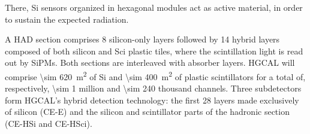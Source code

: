 \documentclass[11pt]{article}
\begin{document}
\cite{bruno_chep23}













There, \ac{Si} sensors organized in hexagonal modules act as active material, in order to sustain the expected radiation.
\cite{refCUDA1}

A \ac{HAD} section comprises \num{8} silicon-only layers followed by \num{14} hybrid layers composed of both silicon and \ac{Sci} plastic tiles, where the scintillation light is read out by \acp{SiPM}.
Both sections are interleaved with absorber layers.
\ac{HGCAL} will comprise \SI{\sim 620}{\meter\squared} of \ac{Si} and \SI{\sim 400}{\meter\squared} of plastic scintillators for a total of, respectively, \num{\sim 1} million and \num{\sim 240} thousand channels.
Three subdetectors form HGCAL’s hybrid detection technology: the first \num{28} layers made exclusively of silicon (\ac{CE-E}) and the silicon and scintillator parts of the hadronic section (CE-HSi and CE-HSci).
\end{document}
